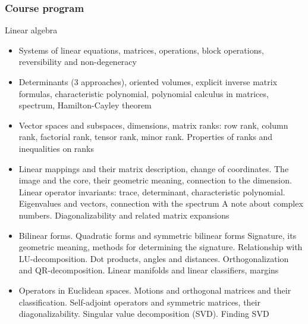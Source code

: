 \documentclass[fullscreen=true, bookmarks=true, hyperref={pdfencoding=unicode}]{beamer}
\begin{document}
\begin{frame}
  \frametitle{Course program}
  
  \pause
  Linear algebra
  {\scriptsize
  \begin{itemize}
      \item Systems of linear equations, matrices, operations, block operations, 
      reversibility and non-degeneracy
      \item Determinants (3 approaches), oriented volumes, explicit inverse matrix formulas, 
      characteristic polynomial, polynomial calculus in matrices, spectrum, Hamilton-Cayley theorem
      \item Vector spaces and subspaces, dimensions, matrix ranks: row rank, column rank, 
      factorial rank, tensor rank, minor rank. Properties of ranks and inequalities on ranks
      \item Linear mappings and their matrix description, change of coordinates. 
      The image and the core, their geometric meaning, connection to the dimension. 
      Linear operator invariants: trace, determinant, characteristic polynomial. 
      Eigenvalues and vectors, connection with the spectrum
      A note about complex numbers. Diagonalizability and related matrix expansions
      \item Bilinear forms. Quadratic forms and symmetric bilinear forms
      Signature, its geometric meaning, methods for determining the signature. 
      Relationship with LU-decomposition. Dot products, angles and distances. 
      Orthogonalization and QR-decomposition. Linear manifolds and linear classifiers, margins
      \item Operators in Euclidean spaces. Motions and orthogonal matrices and their classification. 
      Self-adjoint operators and symmetric matrices, their diagonalizability. 
      Singular value decomposition (SVD). Finding SVD
  \end{itemize}
  }

\end{frame}
\end{document}
